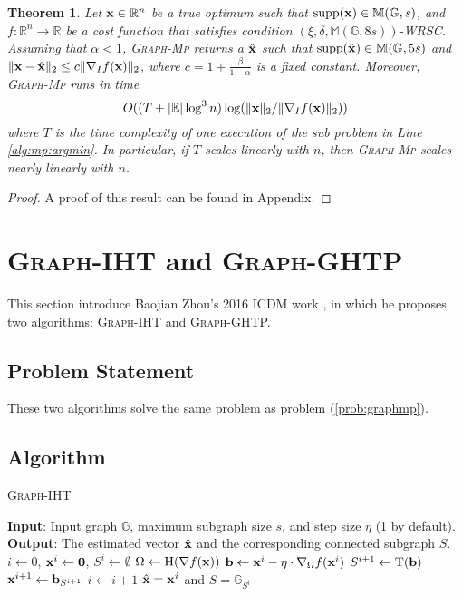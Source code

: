 \documentclass{article}
\let\oldReturn\Return
\renewcommand{\Return}{\State\oldReturn}
\newtheorem{theorem}{Theorem}
\begin{document}
\begin{theorem}\label{thm:mp:time}
Let ${\bf x}\in\mathbb{R}^n$ be a true optimum such that $\mathrm{supp}({\bf x})\in\mathbb{M}(\mathbb{G},s)$, and $f:\mathbb{R}^n\to\mathbb{R}$ be a cost function that satisfies condition $(\xi,\delta,\mathbb{M}(\mathbb{G},8s))$-WRSC. Assuming that $\alpha<1$, \textsc{Graph}-\textsc{Mp} returns a $\hat{{\bf x}}$ such that $\mathrm{supp}(\hat{\bf x})\in\mathbb{M}(\mathbb{G},5s)$ and $\|{\bf x}-\hat{\bf x}\|_2\leq c\|\nabla_I f({\bf x})\|_2$, where $c=1+\frac{\beta}{1-\alpha}$ is a fixed constant. Moreover, \textsc{Graph}-\textsc{Mp} runs in time
\begin{equation}
O((T+|\mathbb{E}|\log^3 n)\log(\|{\bf x}\|_2/\|\nabla_I f({\bf x})\|_2))
\end{equation}
where $T$ is the time complexity of one execution of the sub problem in Line \ref{alg:mp:argmin}. In particular, if $T$ scales linearly with $n$, then \textsc{Graph}-\textsc{Mp} scales nearly linearly with $n$.
\end{theorem}
\begin{proof}
A proof of this result can be found in Appendix.
\end{proof}

\section{\textsc{Graph}-IHT and \textsc{Graph}-GHTP}

This section introduce Baojian Zhou's 2016 ICDM work \cite{zhou2016graph}, in which he proposes two algorithms: \textsc{Graph}-IHT and \textsc{Graph}-GHTP.

\subsection{Problem Statement}

These two algorithms solve the same problem as problem (\ref{prob:graphmp}).

\subsection{Algorithm}

\begin{algorithm}
\caption{\textsc{Graph}-IHT}\label{alg:graphiht}
\begin{algorithmic}[1]
\State \textbf{Input}: Input graph $\mathbb{G}$, maximum subgraph size $s$, and step size $\eta$ (1 by default).
\State \textbf{Output}: The estimated vector $\hat{{\bf x}}$ and the corresponding connected subgraph $S$.
\State $i\gets 0$, ${\bf x}^i\gets {\bf 0}$, $S^i\gets\emptyset$
\Repeat
\State $\Omega\gets\mathrm{H}(\nabla f({\bf x}))$
\State ${\bf b}\gets{\bf x}^{i} -\eta\cdot \nabla_{\Omega} f({\bf x}^i)$\label{alg:iht:update}
\State $S^{i+1}\gets\mathrm{T}({\bf b})$
\State ${\bf x}^{i+1}\gets{\bf b}_{S^{i+1}}$
\State $i\gets i+1$
\Return $\hat{{\bf x}}={\bf x}^i$ and $S=\mathbb{G}_{S^i}$
\end{algorithmic}
\end{algorithm}
\end{document}
